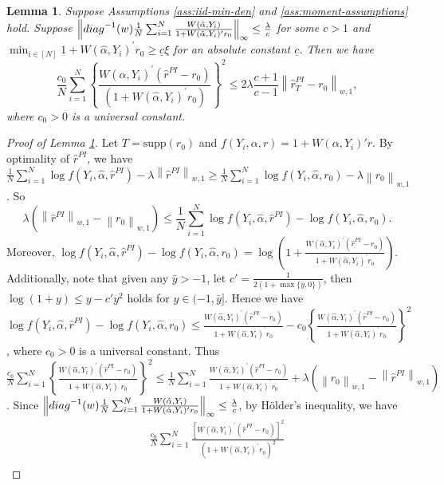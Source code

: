 \documentclass[11pt]{article}
\newtheorem{lemma}{Lemma}
\newcommand{\norm}[1]{\left\lVert #1 \right\rVert}
\begin{document}
\begin{lemma}\label{lemma:fast-rate:estimated-alpha}
    Suppose Assumptions \ref{ass:iid-min-den}  and \ref{ass:moment-assumptions} hold. Suppose $\norm{{\rm diag}^{-1}(w)\frac{1}{N}\sum_{i=1}^N\frac{W(\hat\alpha,Y_i)}{1+W(\hat\alpha,Y_i)^\prime r_0}}_\infty\leq\frac{\lambda}{c}$ for some $c>1$ and $\min_{i\in[N]}1+W(\hat\alpha,Y_i)^\prime r_0\geq \underline{c}\xi$ for an absolute constant $\underline{c}$. Then we have $$\frac{c_0}{N}\sum_{i=1}^N\left\{\frac{W(\hat\alpha,Y_i)^\prime(\hat{r}^{PI}-r_0)}{(1+W(\hat\alpha,Y_i)^\prime r_0)}\right\}^2\leq2\lambda\frac{c+1}{c-1}\norm{\hat{r}_T^{PI}-r_0}_{w,1},$$ 
    where $c_0>0$ is a universal constant.
\end{lemma}
\begin{proof}[Proof of Lemma \ref{lemma:fast-rate:estimated-alpha}]
Let $T=\mathrm{supp}(r_0)$ and $f(Y_i,\alpha,r)=1+W(\alpha,Y_i)'r$. 
By optimality of $\hat{r}^{PI}$, we have $\frac{1}{N}\sum_{i=1}^N\log f(Y_i,\hat\alpha,
\hat{r}^{PI})-\lambda\norm{\hat{r}^{PI}}_{w,1}\geq\frac{1}{N}\sum_{i=1}^N\log f(Y_i,\hat\alpha,r_0)-\lambda\norm{r_0}_{w,1}$. So $$\lambda\left(\norm{\hat r^{PI}}_{w,1}-\norm{r_0}_{w,1}\right)\leq\frac{1}{N}\sum_{i=1}^N\log f(Y_i,\hat\alpha,\hat r^{PI})-\log f(Y_i,\hat\alpha,r_0).$$ 
Moreover, $\displaystyle\log f(Y_i,\hat\alpha,\hat{r}^{PI})-\log f(Y_i,\hat\alpha, r_0)=\log\left(1+\frac{W(\hat\alpha,Y_i)^\prime(\hat{r}^{PI}-r_0)}{1+W(\hat\alpha,Y_i)^\prime r_0}\right)$.
Additionally, note that given any $\bar{y}>-1$, let $c'=\frac{1}{2(1+\max\{\bar{y},0\})}$, then $\log(1+y)\leq y-c'y^2$ holds for $y\in(-1,\bar{y}]$. Hence we have $\log f(Y_i,\hat\alpha,\hat{r}^{PI})-\log f(Y_i,\hat\alpha, r_0)\leq\frac{W(\hat\alpha,Y_i)^\prime(\hat{r}^{PI}-r_0)}{1+W(\hat\alpha,Y_i)^\prime r_0}-c_0\left\{\frac{W(\hat\alpha,Y_i)^\prime(\hat{r}^{PI}-r_0)}{1+W(\hat\alpha,Y_i)^\prime r_0}\right\}^2$, where $c_0>0$ is a universal constant.
Thus $\displaystyle\frac{c_0}{N}\sum_{i=1}^N\left\{\frac{W(\hat\alpha,Y_i)^\prime(\hat{r}^{PI}-r_0)}{1+W(\hat\alpha,Y_i)^\prime r_0}\right\}^2\leq\frac{1}{N}\sum_{i=1}^N\frac{W(\hat\alpha,Y_i)^\prime(\hat{r}^{PI}-r_0)}{1+W(\hat\alpha,Y_i)^\prime r_0}+\lambda\left(\norm{r_0}_{w,1}-\norm{\hat r^{PI}}_{w,1}\right)$. Since $\norm{{\rm diag}^{-1}(w) \frac{1}{N}\sum_{i=1}^N\frac{W(\hat\alpha,Y_i)}{1+W(\hat\alpha,Y_i)^\prime r_0}}_\infty\leq\frac{\lambda}{c}$, by H\"older's inequality, we have 
$$\begin{array}{rl}
&\quad\displaystyle\frac{c_0}{N}\sum_{i=1}^N\frac{\left[W(\hat\alpha,Y_i)^\prime(\hat{r}^{PI}-r_0)\right]^2}{(1+W(\hat\alpha,Y_i)^\prime r_0)^2}\\

\end{array}$$
\end{proof}
\end{document}
